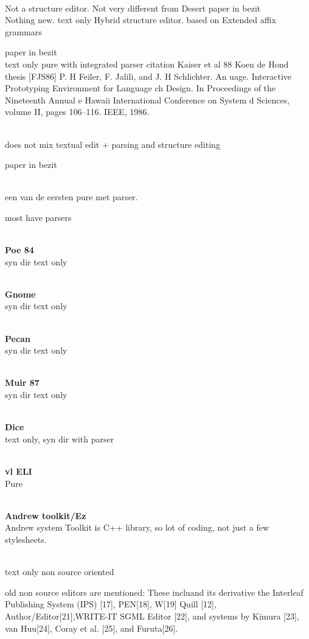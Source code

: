 \\
Not a structure editor. Not very different from Desert
paper in bezit
\\
Nothing new. text only Hybrid structure editor. based on Extended affix grammars

paper in bezit
\\
text only pure with integrated parser
citation Kaiser et al 88 Koen de Hond thesis
[FJS86] P. H Feiler, F. Jalili, and J. H Schlichter. An uage. Interactive Prototyping Environment for Language ch Design. In Proceedings of the Nineteenth Annual e Hawaii International Conference on System d Sciences, volume II, pages 106--116. IEEE, 1986. 

\\
does not mix textual edit + parsing and structure editing

paper in bezit

\\
een van de eersten pure met parser. 

most have parsers

\\ {\bf Poe 84}\\
syn dir text only\cite{fischer84poe}

\\ {\bf Gnome}\\ 
syn dir text only\cite{garlan84gnome}

\\ {\bf Pecan}\\
syn dir text only\cite{reiss84pecan}

\\ {\bf Muir 87}\\
syn dir text only
\cite{normark88muir}

\\ {\bf Dice}\\
text only, syn dir with parser

\\ {\bf vl ELI}\\
Pure

\\ {\bf Andrew toolkit/Ez}\\
Andrew system
Toolkit is C++ library, so lot of coding, not just a few stylesheets.


\\
text only non source oriented


old non source editors are mentioned:
These incluand its derivative the Interleaf Publishing System (IPS) [17],
PEN[18], W[19] Quill [12], Author/Editor[21],WRITE-IT SGML Editor [22], and systems by Kimura [23], van Huu[24], Coray et al. [25], and Furuta[26].


\ec
